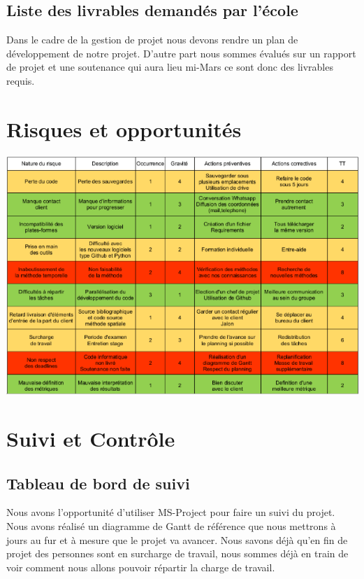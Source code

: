 \documentclass[a4paper,12pt]{report}
\theoremstyle{break}
\begin{document}
\section{Liste des livrables demandés par l’école }

    Dans le cadre de la gestion de projet nous devons rendre un plan de développement de notre projet. D’autre part nous sommes évalués sur un rapport de projet et une soutenance qui aura lieu mi-Mars ce sont donc des livrables requis. 

\chapter{Risques et opportunités}

    \begin{center}

    \includegraphics[width=1\textwidth]{images/matrice.png}\\[1cm]

    \end{center} 
    
\chapter{Suivi et Contrôle}
\section{Tableau de bord de suivi}
    Nous avons l’opportunité d’utiliser MS-Project pour faire un suivi du projet. Nous avons réalisé un diagramme de Gantt de référence que nous mettrons à jours au fur et à mesure que le projet va avancer. Nous savons déjà qu’en fin de projet des personnes sont en surcharge de travail, nous sommes déjà en train de voir comment nous allons pouvoir répartir la charge de travail. 
\end{document}
